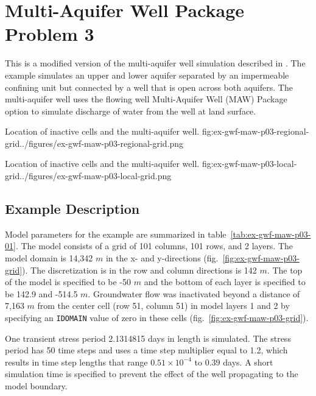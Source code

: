 \section{Multi-Aquifer Well Package Problem 3}

This is a modified version of the multi-aquifer well simulation described in \cite{reilly1989bias}. The example simulates an upper and lower aquifer separated by an impermeable confining unit but connected by a well that is open across both aquifers. The multi-aquifer well uses the flowing well Multi-Aquifer Well (MAW) Package option to simulate discharge of water from the well at land surface.                               

\begin{StandardFigure}{
                                     Location of inactive cells and the multi-aquifer well. 
                                     }{fig:ex-gwf-maw-p03-regional-grid}{../figures/ex-gwf-maw-p03-regional-grid.png}
\end{StandardFigure}   

\begin{StandardFigure}{
                                     Location of inactive cells and the multi-aquifer well. 
                                     }{fig:ex-gwf-maw-p03-local-grid}{../figures/ex-gwf-maw-p03-local-grid.png}
\end{StandardFigure}   


\subsection{Example Description}
Model parameters for the example are summarized in table~\ref{tab:ex-gwf-maw-p03-01}.  The model consists of a grid of 101 columns, 101 rows, and 2 layers. The model domain is 14,342 $m$ in the x- and y-directions (fig.~\ref{fig:ex-gwf-maw-p03-grid}). The discretization is in the row and column directions is 142 $m$. The top of the model is specified to be -50 $m$ and the bottom of each layer is specified to be 142.9 and -514.5 $m$. Groundwater flow was inactivated beyond a distance of 7,163 $m$ from the center cell (row 51, column 51) in model layers 1 and 2 by specifying an \texttt{IDOMAIN} value of zero in these cells (fig.~\ref{fig:ex-gwf-maw-p03-grid}).

One transient stress period 2.1314815 days in length is simulated. The stress period has 50 time steps and uses a time step multiplier equal to 1.2, which results in time step lengths that range $0.51 \times 10^{-4}$ to $0.39$ days. A short simulation time is specified to prevent the effect of the well propagating to the model boundary.

